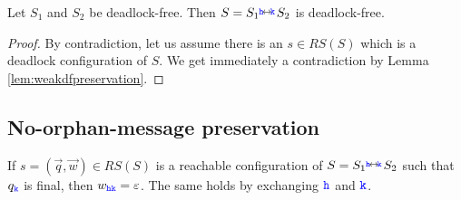\begin{corollary}%
\label{prop:weakdfPreservation}
Let $S_1$ and $S_2$ be deadlock-free.
Then $S = {S_{1}} \stackrel{\hspace{-3pt}{ \ensuremath{\mathtt{\color{blue}{ {h}}}} }\!\leftrightarrow\!{\mathtt{\color{blue}{ {k}}}}\!}{} {S_{2}}$ is deadlock-free.
\end{corollary}
\begin{proof}
By contradiction, let us assume there is an $s\in RS(S)$ which is a deadlock configuration of $S$. We get
immediately a contradiction by Lemma \ref{lem:weakdfpreservation}.
\end{proof}









\subsection{No-orphan-message preservation}


 \begin{lemma}
\label{lem:wempty}
If $s= (\vec{q},\vec{w}) \in RS(S)$ is a reachable configuration of $S={S_{1}}\stackrel{\hspace{-3pt}{ \ensuremath{\mathtt{\color{blue}{ {h}}}} }\!\leftrightarrow\!{\mathtt{\color{blue}{ {k}}}}\!}{} {S_{2}}$ 
such that ${q}_{\mathtt{\color{blue}{ {k}}}}$ is final, then ${w}_{{\mathtt{\color{blue}{ {h}}}}{\mathtt{\color{blue}{ {k}}}}} = \varepsilon$.
The same holds by exchanging ${\mathtt{\color{blue}{ {h}}}}$ and ${\mathtt{\color{blue}{ {k}}}}$.
\end{lemma}

